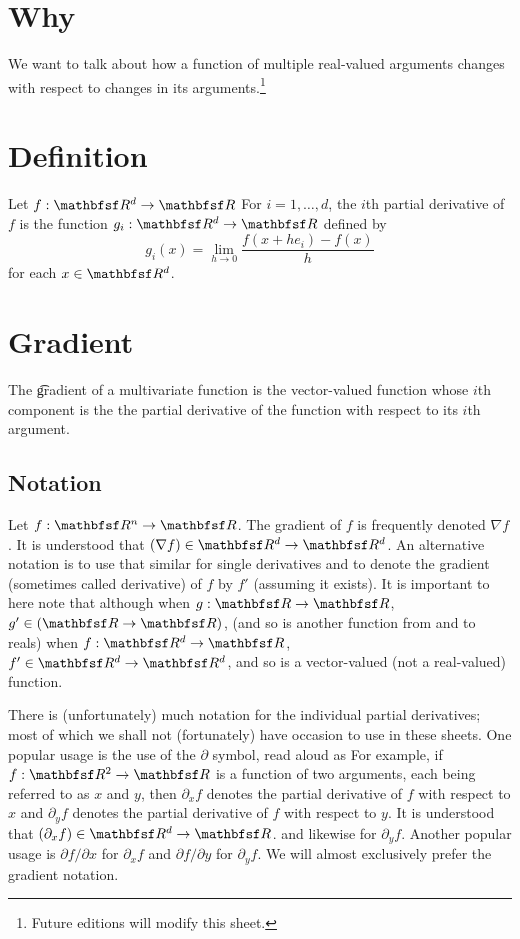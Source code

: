 

\section*{Why}

We want to talk about how a function
of multiple real-valued arguments
changes with respect to changes
in its arguments.\footnote{Future editions will modify this sheet.}

\section*{Definition}

Let $f: \R ^d \to \R $
For $i = 1,\dots ,d$, the \t{$i$th partial derivative} of $f$ is the function $g_i: \R ^d \to \R $ defined by
    \[
g_i(x) = \lim_{h \to 0} \frac{f(x + he_i) - f(x)}{h}
    \]
for each $x \in \R ^d$.

\section*{Gradient}

The \t{gradient} of a multivariate function is the vector-valued function whose $i$th component is the the partial derivative of the function with respect to its $i$th argument.

\subsection*{Notation}

Let $f: \R ^n \to \R $.
The gradient of $f$ is frequently denoted $\nabla f$.
It is understood that $(\nabla f) \in \R ^d \to \R ^d$.
An alternative notation is to use that similar for single derivatives and to denote the gradient (sometimes called derivative) of $f$ by $f'$ (assuming it exists).
It is important to here note that although when $g: \R  \to \R $, $g' \in (\R  \to \R )$, (and so is another function from and to reals) when $f: \R ^d \to \R $, $f' \in \R ^d \to \R ^d$, and so is a vector-valued (not a real-valued) function.

There is (unfortunately) much notation for the individual partial derivatives; most of which we shall not (fortunately) have occasion to use in these sheets.
One popular usage is the use of the $\partial $ symbol, read aloud as 
For example, if $f: \R ^2 \to \R $ is a function of two arguments, each being referred to as $x$ and $y$, then $\partial _x f$ denotes the partial derivative of $f$ with respect to $x$ and $\partial _y f$ denotes the partial derivative of $f$ with respect to $y$.
It is understood that $(\partial _x f) \in \R ^d \to \R $. and likewise for $\partial _y f$.
Another popular usage is $\partial f/\partial x$ for $\partial _x f$ and $\partial f/\partial y$ for $\partial _y f$.
We will almost exclusively prefer the gradient notation.

